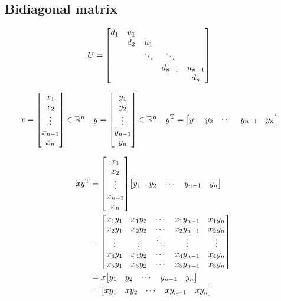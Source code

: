 \documentclass[11pt]{article}
\newcommand{\T}{\mathrm{T}}
\begin{document}
\subsection{Bidiagonal matrix}





\begin{align*}
    U &= \mqty[
        d_{1} & u_{1} &   &   &  \\
          & d_{2} & u_{1} &   &  \\
          &   & \ddots & \ddots &  \\
          &   &   & d_{n-1} & u_{n-1}\\
          &   &   &   & d_{n}
        ]
\end{align*}




\begin{align*}
    x &= \mqty[
        x_{1} \\
        x_{2} \\
        \vdots \\
        x_{n-1} \\
        x_{n}
        ]
    \in \mathbb{R}^n
    &
    y &= \mqty[
        y_{1} \\
        y_{2} \\
        \vdots \\
        y_{n-1} \\
        y_{n}
        ]
    \in \mathbb{R}^n
    &
    y^{\T} &= \mqty[
        y_{1} & y_{2} & \cdots & y_{n-1} & y_{n}
        ]
\end{align*}



\begin{align*}
    xy^{\T} &= \mqty[
        x_{1} \\
        x_{2} \\
        \vdots \\
        x_{n-1} \\
        x_{n}
        ]
        \mqty[
        y_{1} & y_{2} & \cdots & y_{n-1} & y_{n}
        ]\\
    &= \mqty[
        x_{1} y_{1} & x_{1} y_{2} & \cdots & x_{1} y_{n-1} & x_{1} y_{n}\\
        x_{2} y_{1} & x_{2} y_{2} & \cdots & x_{2} y_{n-1} & x_{2} y_{n}\\
        \vdots & \vdots & \ddots & \vdots & \vdots\\
        x_{4} y_{1} & x_{4} y_{2} & \cdots & x_{4} y_{n-1} & x_{4} y_{n}\\
        x_{5} y_{1} & x_{5} y_{2} & \cdots & x_{5} y_{n-1} & x_{5} y_{n}
        ]\\
    &= x\mqty[
            y_{1} & y_{2} & \cdots & y_{n-1} & y_{n}
            ]\\
    &= \mqty[
        xy_{1} & xy_{2} & \cdots & xy_{n-1} & xy_{n}
        ]
\end{align*}
\end{document}
